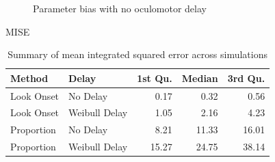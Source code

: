 \documentclass{beamer}
\begin{document}
\begin{frame}
\begin{figure}[H]
\centering
\caption{Parameter bias with no oculomotor delay}
\label{fig:par_bias_no_delay}
\end{figure}
\end{frame}

\begin{frame}{MISE}

\begin{table}[H]
\centering
\begin{tabular}{llrrr}
  \hline
Method & Delay & 1st Qu. & Median & 3rd Qu. \\ 
  \hline
Look Onset & No Delay & 0.17 & 0.32 & 0.56 \\ 
  Look Onset & Weibull Delay & 1.05 & 2.16 & 4.23 \\ 
  Proportion & No Delay & 8.21 & 11.33 & 16.01 \\ 
  Proportion & Weibull Delay & 15.27 & 24.75 & 38.14 \\ 
   \hline
\end{tabular}
\caption{Summary of mean integrated squared error across simulations}
\label{tab:mise_sims}
\end{table}

\end{frame}
\end{document}
